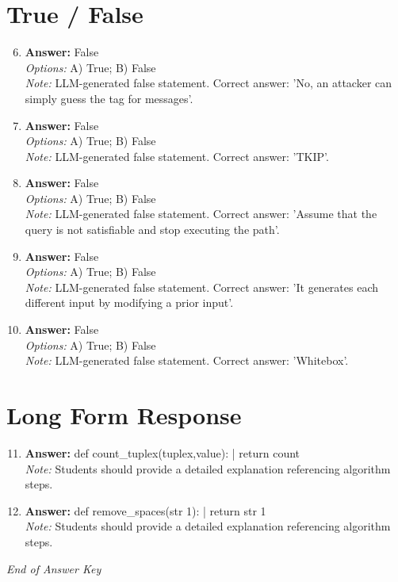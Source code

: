 \documentclass[12pt]{article}
\begin{document}
\section*{True / False}
\begin{enumerate}[label=\arabic*.]
\setcounter{enumi}{5}
\item \textbf{Answer:} False
\\ \textit{Options:} A) True; B) False
\\ \textit{Note:} LLM-generated false statement. Correct answer: 'No, an attacker can simply guess the tag for messages'.
\item \textbf{Answer:} False
\\ \textit{Options:} A) True; B) False
\\ \textit{Note:} LLM-generated false statement. Correct answer: 'TKIP'.
\item \textbf{Answer:} False
\\ \textit{Options:} A) True; B) False
\\ \textit{Note:} LLM-generated false statement. Correct answer: 'Assume that the query is not satisfiable and stop executing the path'.
\item \textbf{Answer:} False
\\ \textit{Options:} A) True; B) False
\\ \textit{Note:} LLM-generated false statement. Correct answer: 'It generates each different input by modifying a prior input'.
\item \textbf{Answer:} False
\\ \textit{Options:} A) True; B) False
\\ \textit{Note:} LLM-generated false statement. Correct answer: 'Whitebox'.
\end{enumerate}

\section*{Long Form Response}
\begin{enumerate}[label=\arabic*.]
\setcounter{enumi}{10}
\item \textbf{Answer:} def count\_tuplex(tuplex,value): | return count
\\ \textit{Note:} Students should provide a detailed explanation referencing algorithm steps.
\item \textbf{Answer:} def remove\_spaces(str 1): | return str 1
\\ \textit{Note:} Students should provide a detailed explanation referencing algorithm steps.
\end{enumerate}

\vfill
\noindent\textit{End of Answer Key}
\end{document}
